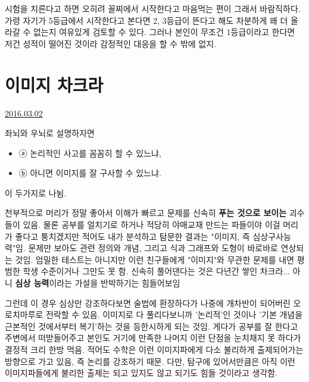 시험을 치른다고 하면 오히려 꼴찌에서 시작한다고 마음먹는 편이 그래서 바람직하다.
가령 자기가 5등급에서 시작한다고 본다면 2, 3등급이 뜬다고 해도 차분하게 왜 더 올라갈 수 없는지 여유있게 검토할 수 있다.
그러나 본인이 무조건 1등급이라고 한다면 저건 성적이 떨어진 것이라 감정적인 대응을 할 수 밖에 없지.
\vspace{5mm}




\section{이미지 차크라}
\href{https://www.kockoc.com/Apoc/659029}{2016.03.02}

\vspace{5mm}

좌뇌와 우뇌로 설명하자면
\vspace{5mm}
\begin{itemize}
    \item[] ⓐ 논리적인 사고를 꼼꼼히 할 수 있느냐,
    \item[] ⓑ 아니면 이미지를 잘 구사할 수 있느냐.
\end{itemize}
\vspace{5mm}

이 두가지로 나뉨.
\vspace{5mm}

천부적으로 머리가 정말 좋아서 이해가 빠르고 문제를 신속히 \textbf{푸는 것으로 보이는} 괴수들이 있음.
물론 공부를 얼치기로 하거나 적당히 야매교재 만드는 파들이야 이걸 머리가 좋다고 퉁치겠지만
적어도 내가 분석하고 탐문한 결과는 "이미지, 즉 심상구사능력"임.
문제만 보아도 관련 정의와 개념, 그리고 식과 그래프와 도형이 바로바로 연상되는 것임.
엄밀한 테스트는 아니지만 이런 친구들에게 "이미지"와 무관한 문제를 내면 평범한 학생 수준이거나 그만도 못 함.
신속히 풀어댄다는 것은 다년간 쌓인 차크라... 아니 \textbf{심상 능력}이라는 가설을 반박하기는 힘들어보임
\vspace{5mm}

그런데 이 경우 심상만 강조하다보면 술법에 환장하다가 나중에 개차반이 되어버린 오로치마루로 전락할 수 있음.
이미지로 다 풀리다보니까 '논리적'인 것이나 '기본 개념을 근본적인 것에서부터 복기'하는 것을 등한시하게 되는 것임.
게다가 공부를 잘 한다고 주변에서 떠받들어주고 본인도 거기에 만족한 나머지 이런 단점을 눈치채지 못 하다가 결정적 크리 한방 먹음.
적어도 수학은 이런 이미지파에게 다소 불리하게 출제되어가는 방향으로 가고 있음, 즉 논리를 강조하기 때문.
다만, 탐구에 있어서만큼은 아직 이런 이미지파들에게 불리한 출제는 되고 있지도 않고 되기도 힘들 것이라고 생각함.
\vspace{5mm}

